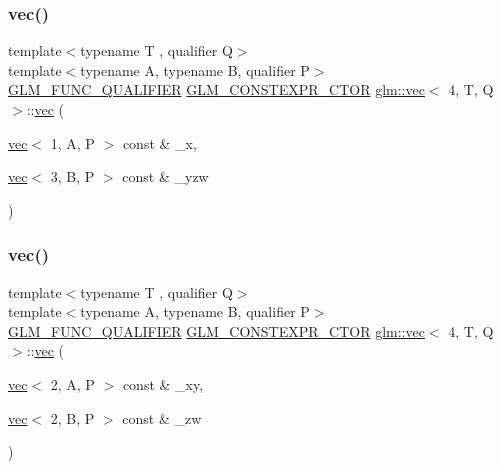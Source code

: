 \mbox{\label{structglm_1_1vec_3_014_00_01_t_00_01_q_01_4_a25424f78a9e0345486eeaafbcd1c8a7e}} 
\subsubsection{\texorpdfstring{vec()}{vec()}\hspace{0.1cm}{\footnotesize\ttfamily [32/34]}}
{\footnotesize\ttfamily template$<$typename T , qualifier Q$>$ \\
template$<$typename A, typename B, qualifier P$>$ \\
\hyperlink{setup_8hpp_a33fdea6f91c5f834105f7415e2a64407}{G\+L\+M\+\_\+\+F\+U\+N\+C\+\_\+\+Q\+U\+A\+L\+I\+F\+I\+ER} \hyperlink{setup_8hpp_ad34178a09666081abdb573c14d1f4a5a}{G\+L\+M\+\_\+\+C\+O\+N\+S\+T\+E\+X\+P\+R\+\_\+\+C\+T\+OR} \hyperlink{structglm_1_1vec}{glm\+::vec}$<$ 4, T, Q $>$\+::\hyperlink{structglm_1_1vec}{vec} (\begin{DoxyParamCaption}\item[{\hyperlink{structglm_1_1vec}{vec}$<$ 1, A, P $>$ const \&}]{\+\_\+x,  }\item[{\hyperlink{structglm_1_1vec}{vec}$<$ 3, B, P $>$ const \&}]{\+\_\+yzw }\end{DoxyParamCaption})}

\mbox{\label{structglm_1_1vec_3_014_00_01_t_00_01_q_01_4_a6273e714a533a4354356ad4a130bf535}} 
\subsubsection{\texorpdfstring{vec()}{vec()}\hspace{0.1cm}{\footnotesize\ttfamily [33/34]}}
{\footnotesize\ttfamily template$<$typename T , qualifier Q$>$ \\
template$<$typename A, typename B, qualifier P$>$ \\
\hyperlink{setup_8hpp_a33fdea6f91c5f834105f7415e2a64407}{G\+L\+M\+\_\+\+F\+U\+N\+C\+\_\+\+Q\+U\+A\+L\+I\+F\+I\+ER} \hyperlink{setup_8hpp_ad34178a09666081abdb573c14d1f4a5a}{G\+L\+M\+\_\+\+C\+O\+N\+S\+T\+E\+X\+P\+R\+\_\+\+C\+T\+OR} \hyperlink{structglm_1_1vec}{glm\+::vec}$<$ 4, T, Q $>$\+::\hyperlink{structglm_1_1vec}{vec} (\begin{DoxyParamCaption}\item[{\hyperlink{structglm_1_1vec}{vec}$<$ 2, A, P $>$ const \&}]{\+\_\+xy,  }\item[{\hyperlink{structglm_1_1vec}{vec}$<$ 2, B, P $>$ const \&}]{\+\_\+zw }\end{DoxyParamCaption})}

